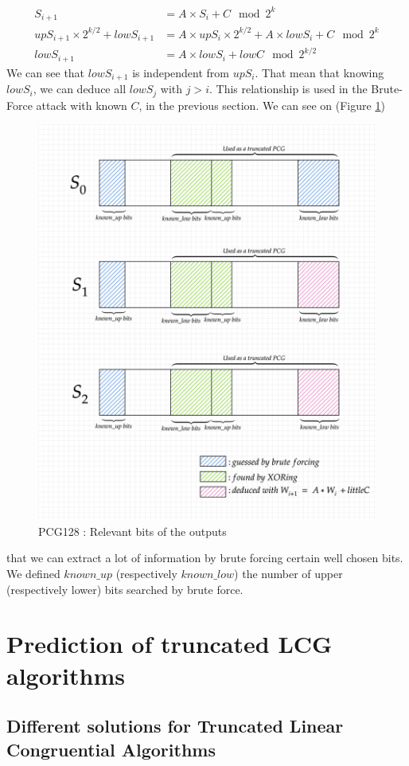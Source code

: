 \documentclass[preprint]{iacrtrans}
\begin{document}
\begin{align}
    S_{i+1} &= A \times S_i + C \mod{2^k}\\
    upS_{i+1} \times 2^{k/2} + lowS_{i+1} &= A \times upS_i \times 2^{k/2} + A \times lowS_i + C \mod{2^k} \\
    lowS_{i+1} &= A \times lowS_i + lowC \mod 2^{k/2}
\end{align}
We can see that $lowS_{i+1}$ is independent from $upS_i$. That mean that knowing $lowS_i$, we can deduce all $lowS_j$ with $j>i$. This relationship is used in the Brute-Force attack with known $C$, in the previous section.
We can see on (Figure \ref{pcg128goodbits})%
\begin{figure}[h!]
    \centering
    \includegraphics[width=0.70\linewidth]{pictures/deducingPCG128.png}
    \caption{PCG128 : Relevant bits of the outputs}
    \label{pcg128goodbits}
\end{figure}
that we can extract a lot of information by brute forcing certain well chosen bits. We defined $known\_up$ (respectively $known\_low$) the number of upper (respectively lower) bits searched by brute force.
\newpage

\section{Prediction of truncated LCG algorithms}

\subsection{Different solutions for Truncated Linear Congruential Algorithms}
\end{document}
